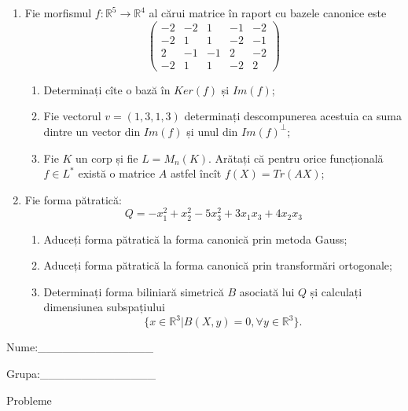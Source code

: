 \documentclass{article}
\begin{document}
\begin{enumerate}
 \item Fie morfismul $f:\mathbb{R}^5 \to \mathbb{R}^4$ al cărui matrice în raport cu bazele canonice este
$$\begin{pmatrix}
-2&-2&1&-1&-2\\
-2&1&1&-2&-1\\
2&-1&-1&2&-2\\
-2&1&1&-2&2
\end{pmatrix}$$

\begin{enumerate}
\item Determinați cîte o bază în $Ker(f)$ și $Im(f)$;
\item Fie vectorul $v=(1,3,1,3)$ determinați descompunerea acestuia ca suma dintre un vector din $Im(f)$ și unul din $Im(f)^\perp$;
\item Fie $K$ un corp și fie $L=M_n(K)$. Arătați că pentru orice funcțională $f \in L^*$ există o matrice $A$ astfel încît $f(X)=Tr(AX)$;
\end{enumerate}
\item Fie forma pătratică:
$$Q= -x_1^2+x_2^2-5x_3^2+3x_1x_3+4x_2x_3$$

\begin{enumerate}
\item Aduceți forma pătratică la forma canonică prin metoda Gauss;
\item Aduceți forma pătratică la forma canonică prin transformări ortogonale;
\item Determinați forma biliniară simetrică $B$ asociată lui $Q$ și calculați dimensiunea subspațiului
$$\{x \in \mathbb{R}^3 | B(X,y)=0,\forall y \in \mathbb{R}^3\}.$$

\end{enumerate}
\end{enumerate}
\newpage
\begin{flushright}
Nume:\_\_\_\_\_\_\_\_\_\_\_\_\_\_
 
 
Grupa:\_\_\_\_\_\_\_\_\_\_\_\_\_\_
\end{flushright}
\begin{center}
\vspace{2cm}
{\Large Probleme}
\vspace{2cm}
\end{center}
\end{document}
